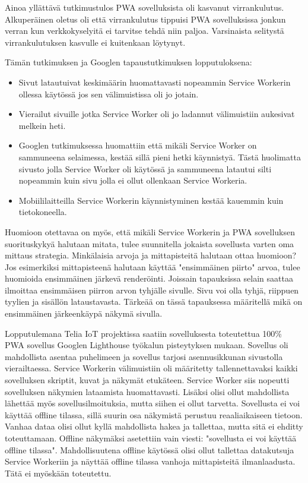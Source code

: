 \documentclass{tktltiki}
\begin{document}
Ainoa yllättävä tutkimustulos PWA sovelluksista oli kasvanut virrankulutus. Alkuperäinen oletus oli että virrankulutus tippuisi PWA sovelluksissa jonkun verran kun verkkokyselyitä ei tarvitse tehdä niin paljoa. Varsinaista selitystä virrankulutuksen kasvulle ei kuitenkaan löytynyt. 

Tämän tutkimuksen ja Googlen tapaustutkimuksen lopputuloksena:

\begin{itemize}
  \item Sivut latautuivat keskimäärin huomattavasti nopeammin Service Workerin ollessa käytössä jos sen välimuistissa oli jo jotain.
  \item Vierailut sivuille jotka Service Worker oli jo ladannut välimuistiin aukesivat melkein heti.
  \item Googlen tutkimuksessa huomattiin että mikäli Service Worker on sammuneena selaimessa, kestää sillä pieni hetki käynnistyä. Tästä huolimatta sivusto jolla Service Worker oli käytössä ja sammuneena latautui silti nopeammin kuin sivu jolla ei ollut ollenkaan Service Workeria.
  \item Mobiililaitteilla Service Workerin käynnistyminen kestää kauemmin kuin tietokoneella.
\end{itemize}

Huomioon otettavaa on myös, että mikäli Service Workerin ja PWA sovelluksen suorituskykyä halutaan mitata, tulee suunnitella jokaista sovellusta varten oma mittaus strategia. Minkälaisia arvoja ja mittapisteitä halutaan ottaa huomioon? Jos esimerkiksi mittapisteenä halutaan käyttää "ensimmäinen piirto" arvoa, tulee huomioida ensimmäinen järkevä renderöinti. Joissain tapauksissa selain saattaa ilmoittaa ensimmäisen piirron arvon tyhjälle sivulle. Sivu voi olla tyhjä, riippuen tyylien ja sisällön lataustavasta. Tärkeää on tässä tapauksessa määritellä mikä on ensimmäinen järkeenkäypä näkymä sivulla.  

Lopputulemana Telia IoT projektissa saatiin sovelluksesta toteutettua 100\% PWA sovellus Googlen Lighthouse työkalun pisteytyksen mukaan. Sovellus oli mahdollista asentaa puhelimeen ja sovellus tarjosi asennusikkunan sivustolla vierailtaessa. Service Workerin välimuistiin oli määritetty tallennettavaksi kaikki sovelluksen skriptit, kuvat ja näkymät etukäteen. Service Worker siis nopeutti sovelluksen näkymien lataamista huomattavasti. Lisäksi olisi ollut mahdollista lähettää myös sovellusilmoituksia, mutta siihen ei ollut tarvetta. Sovellusta ei voi käyttää offline tilassa, sillä suurin osa näkymistä perustuu reaaliaikaiseen tietoon. Vanhaa dataa olisi ollut kyllä  mahdollista hakea ja tallettaa, mutta sitä ei ehditty toteuttamaan. Offline näkymäksi asetettiin vain viesti: "sovellusta ei voi käyttää offline tilassa". Mahdollisuutena offline käytössä olisi ollut tallettaa datakutsuja Service Workeriin ja näyttää offline tilassa vanhoja mittapisteitä ilmanlaadusta. Tätä ei myöskään toteutettu.
\end{document}

